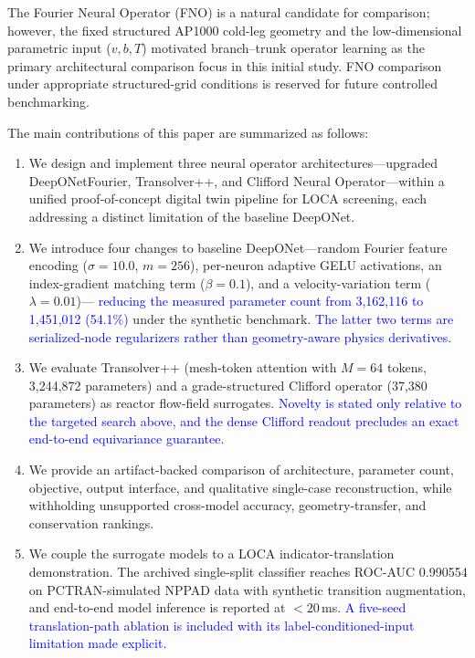 \documentclass[journal]{IEEEtran}
\newcommand{\added}[1]{\textcolor{blue}{#1}}
\begin{document}
The Fourier Neural Operator (FNO) \cite{li2021fno} is a natural candidate for comparison; however, the fixed structured AP1000 cold-leg geometry and the low-dimensional parametric input ($v, b, T$) motivated branch--trunk operator learning as the primary architectural comparison focus in this initial study. FNO comparison under appropriate structured-grid conditions is reserved for future controlled benchmarking.

The main contributions of this paper are summarized as follows:
\begin{enumerate}
    \item We design and implement three neural operator architectures---upgraded DeepONetFourier, Transolver++, and Clifford Neural Operator---within a unified proof-of-concept digital twin pipeline for LOCA screening, each addressing a distinct limitation of the baseline DeepONet.
    \item We introduce four changes to baseline DeepONet---random Fourier feature encoding ($\sigma = 10.0$, $m = 256$), per-neuron adaptive GELU activations, an index-gradient matching term ($\beta = 0.1$), and a velocity-variation term ($\lambda = 0.01$)--- \added{reducing the measured parameter count from 3,162,116 to 1,451,012 (54.1\%)} under the synthetic benchmark. \added{The latter two terms are serialized-node regularizers rather than geometry-aware physics derivatives.}
    \item We evaluate Transolver++ (mesh-token attention with $M = 64$ tokens, 3,244,872 parameters) and a grade-structured Clifford operator (37,380 parameters) as reactor flow-field surrogates.  \added{Novelty is stated only relative to the targeted search above, and the dense Clifford readout precludes an exact end-to-end equivariance guarantee.}
    \item We provide an artifact-backed comparison of architecture, parameter count, objective, output interface, and qualitative single-case reconstruction, while withholding unsupported cross-model accuracy, geometry-transfer, and conservation rankings.
    \item We couple the surrogate models to a LOCA indicator-translation demonstration. The archived single-split classifier reaches ROC-AUC 0.990554 on PCTRAN-simulated NPPAD data with synthetic transition augmentation, and end-to-end model inference is reported at $< 20$\,ms. \added{A five-seed translation-path ablation is included with its label-conditioned-input limitation made explicit.}
\end{enumerate}
\end{document}
